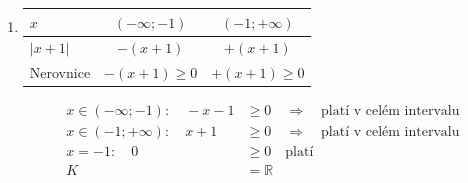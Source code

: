 \documentclass[11pt,a4paper]{article}
\begin{document}
\begin{zadaniReseniBox}[title={Domácí úkol}]
\begin{enumerate}[label=\alph*),itemsep=1pt]
\begin{center}
\begin{tabular}{@{}lcc@{}}
$x$ & $(-\infty;- \frac{1}{2})$ & $(- \frac{1}{2};+\infty)$ \\
\midrule
$|2 x + 1|$ & $-(2 x + 1)$ & $+(2 x + 1)$ \\
\midrule
Nerovnice & $-(2 x + 1)>5$ & $+(2 x + 1)>5$ \\
\bottomrule
\end{tabular}
\endgroup
\end{center}
\[\begin{aligned}x\in (-\infty;- \frac{1}{2}):\quad - 2 x - 1 &> 5\quad\Longrightarrow\quad x\in(-\infty;-3)\\[2pt]
x\in (- \frac{1}{2};+\infty):\quad 2 x + 1 &> 5\quad\Longrightarrow\quad x\in(2;+\infty)\\[2pt]
x=- \frac{1}{2}:\quad 0 &> 5\quad\text{neplatí}\\[2pt]
K&=(-\infty;-3)\cup(2;+\infty)\end{aligned}\]
\item
\begin{center}
\begingroup\footnotesize
\renewcommand{\arraystretch}{1.32}
\begin{tabular}{@{}lcc@{}}
\toprule
$x$ & $(-\infty;-1)$ & $(-1;+\infty)$ \\
\midrule
$|x + 1|$ & $-(x + 1)$ & $+(x + 1)$ \\
\midrule
Nerovnice & $-(x + 1)\ge0$ & $+(x + 1)\ge0$ \\
\bottomrule
\end{tabular}
\endgroup
\end{center}
\[\begin{aligned}x\in (-\infty;-1):\quad - x - 1 &\ge 0\quad\Longrightarrow\quad \text{platí v celém intervalu}\\[2pt]
x\in (-1;+\infty):\quad x + 1 &\ge 0\quad\Longrightarrow\quad \text{platí v celém intervalu}\\[2pt]
x=-1:\quad 0 &\ge 0\quad\text{platí}\\[2pt]
K&=\mathbb R\end{aligned}\]
\end{enumerate}
\end{zadaniReseniBox}
\end{document}
